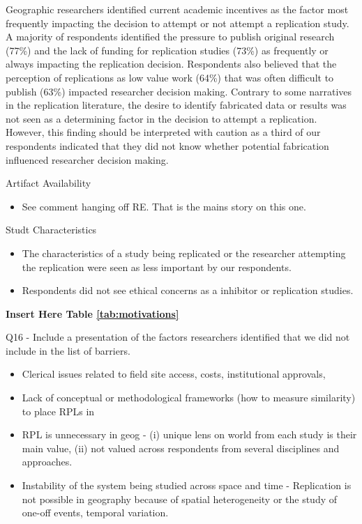 \documentclass[]{interact}
\theoremstyle{plain}%
\theoremstyle{definition}
\theoremstyle{remark}
\begin{document}
Geographic researchers identified current academic incentives as the factor most frequently impacting the decision to attempt or not attempt a replication study. 
A majority of respondents identified the pressure to publish original research (77\%) and the lack of funding for replication studies (73\%) as frequently or always impacting the replication decision.
Respondents also believed that the perception of replications as low value work (64\%) that was often difficult to publish (63\%) impacted researcher decision making.  
Contrary to some narratives in the replication literature, the desire to identify fabricated data or results was not seen as a determining factor in the decision to attempt a replication. 
However, this finding should be interpreted with caution as a third of our respondents indicated that they did not know whether potential fabrication influenced researcher decision making.  

Artifact Availability
\begin{itemize}
    \item See comment hanging off RE. That is the mains story on this one. 
\end{itemize}

Studt Characteristics
\begin{itemize}
    \item The characteristics of a study being replicated or the researcher attempting the replication were seen as less important by our respondents. 
    \item Respondents did not see ethical concerns as a inhibitor or replication studies.
\end{itemize}

\begin{center}
    \textbf{Insert Here Table \ref{tab:motivations}} 
\end{center}

Q16 - Include a presentation of the factors researchers identified that we did not include in the list of barriers.
\begin{itemize}
    \item Clerical issues related to field site access, costs, institutional approvals, 
    \item Lack of conceptual or methodological frameworks (how to measure similarity) to place RPLs in
    \item RPL is unnecessary in geog - (i) unique lens on world from each study is their main value, (ii) not valued across respondents from several disciplines and approaches.
    \item Instability of the system being studied across space and time - Replication is not possible in geography because of spatial heterogeneity or the study of one-off events, temporal variation.   
\end{itemize}
\end{document}
